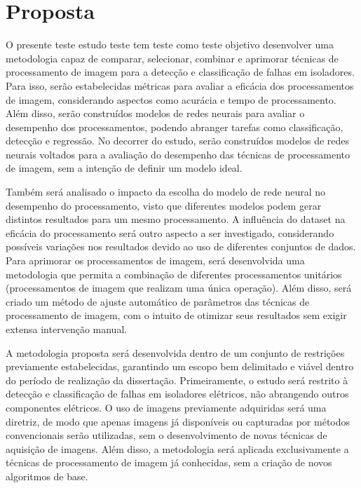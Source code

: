 \maketitle

\newpage

\section{Proposta}

O presente teste estudo teste tem teste como teste objetivo desenvolver uma metodologia capaz de comparar, selecionar, combinar e aprimorar técnicas de processamento de imagem para a detecção e classificação de falhas em isoladores. Para isso, serão estabelecidas métricas para avaliar a eficácia dos processamentos de imagem, considerando aspectos como acurácia e tempo de processamento. Além disso, serão construídos modelos de redes neurais para avaliar o desempenho dos processamentos, podendo abranger tarefas como classificação, detecção e regressão. No decorrer do estudo, serão construídos modelos de redes neurais voltados para a avaliação do desempenho das técnicas de processamento de imagem, sem a intenção de definir um modelo ideal.

Também será analisado o impacto da escolha do modelo de rede neural no desempenho do processamento, visto que diferentes modelos podem gerar distintos resultados para um mesmo processamento. A influência do dataset na eficácia do processamento será outro aspecto a ser investigado, considerando possíveis variações nos resultados devido ao uso de diferentes conjuntos de dados. Para aprimorar os processamentos de imagem, será desenvolvida uma metodologia que permita a combinação de diferentes processamentos unitários (processamentos de imagem que realizam uma única operação). Além disso, será criado um método de ajuste automático de parâmetros das técnicas de processamento de imagem, com o intuito de otimizar seus resultados sem exigir extensa intervenção manual.

A metodologia proposta será desenvolvida dentro de um conjunto de restrições previamente estabelecidas, garantindo um escopo bem delimitado e viável dentro do período de realização da dissertação. Primeiramente, o estudo será restrito à detecção e classificação de falhas em isoladores elétricos, não abrangendo outros componentes elétricos. O uso de imagens previamente adquiridas será uma diretriz, de modo que apenas imagens já disponíveis ou capturadas por métodos convencionais serão utilizadas, sem o desenvolvimento de novas técnicas de aquisição de imagens. Além disso, a metodologia será aplicada exclusivamente a técnicas de processamento de imagem já conhecidas, sem a criação de novos algoritmos de base.

